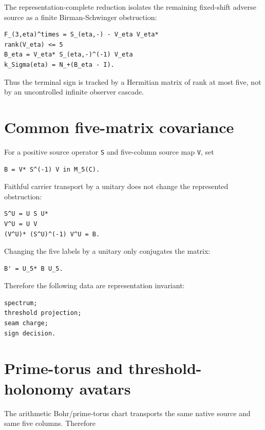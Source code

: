 The representation-complete reduction isolates the remaining fixed-shift adverse source as a finite Birman-Schwinger obstruction:

\begin{verbatim}
F_(3,eta)^times = S_(eta,-) - V_eta V_eta*
rank(V_eta) <= 5
B_eta = V_eta* S_(eta,-)^(-1) V_eta
k_Sigma(eta) = N_+(B_eta - I).
\end{verbatim}

Thus the terminal sign is tracked by a Hermitian matrix of rank at most five, not by an uncontrolled infinite observer cascade.

\hypertarget{common-five-matrix-covariance}{%
\section{Common five-matrix covariance}\label{common-five-matrix-covariance}}

For a positive source operator \texttt{S} and five-column source map \texttt{V}, set

\begin{verbatim}
B = V* S^(-1) V in M_5(C).
\end{verbatim}

Faithful carrier transport by a unitary does not change the represented obstruction:

\begin{verbatim}
S^U = U S U*
V^U = U V
(V^U)* (S^U)^(-1) V^U = B.
\end{verbatim}

Changing the five labels by a unitary only conjugates the matrix:

\begin{verbatim}
B' = U_5* B U_5.
\end{verbatim}

Therefore the following data are representation invariant:

\begin{verbatim}
spectrum;
threshold projection;
seam charge;
sign decision.
\end{verbatim}

\hypertarget{prime-torus-and-threshold-holonomy-avatars}{%
\section{Prime-torus and threshold-holonomy avatars}\label{prime-torus-and-threshold-holonomy-avatars}}

The arithmetic Bohr/prime-torus chart transports the same native source and same five columns. Therefore

